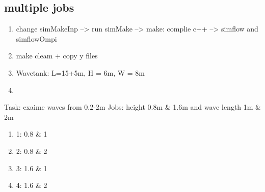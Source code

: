 \documentclass[12pt]{article} %
\begin{document}
\subsection{multiple jobs}
\begin{enumerate}
    \item change simMakeInp --> run simMake --> make: complie c++ --> simflow and simflowOmpi
    \item make cleam + copy y files
    \item Wavetank: L=15+5m, H = 6m, W = 8m
    \item 
\end{enumerate}
Task: exaime waves from 0.2-2m 
Jobs: height 0.8m \& 1.6m and wave length 1m \& 2m
\begin{enumerate}
    \item 1: 0.8 \& 1
    \item 2: 0.8 \& 2
    \item 3: 1.6 \& 1
    \item 4: 1.6 \& 2
\end{enumerate}
\end{document}
